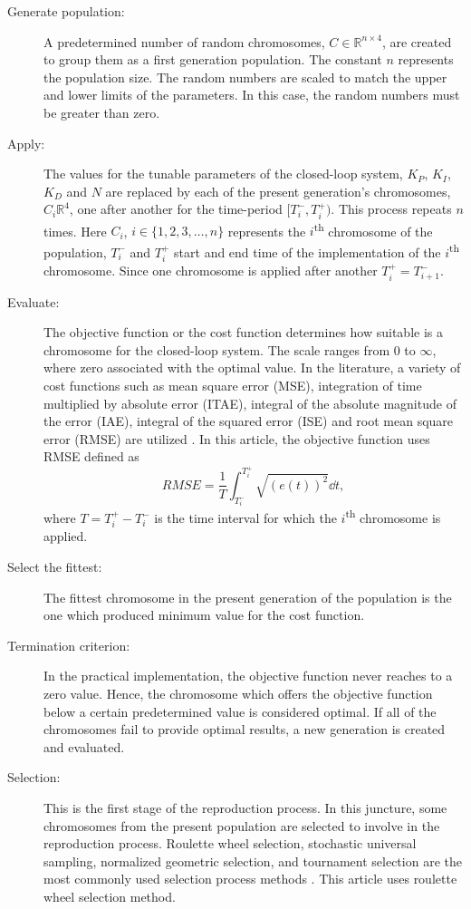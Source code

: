 \documentclass[conference, a4paper, final]{IEEEtran} %
\begin{document}
\begin{description}
    \item[Generate population:] A predetermined number of random chromosomes, $C\in \mathbb{R}^{n\times 4}$, are created to group them as a first generation population. The constant $n$ represents the population size. The random numbers are scaled to match the upper and lower limits of the parameters. In this case, the random numbers must be greater than zero.
    \item[Apply:] The values for the tunable parameters of the closed-loop system, $K_P$, $K_I$, $K_D$ and $N$ are replaced by each of the present generation's chromosomes, $C_i\mathbb{R}^{4}$, one after another for the time-period $[T_i^-, T_i^+)$. This process repeats $n$ times. Here $C_i$, $i \in \{1, 2, 3, \dots, n\}$ represents the $i$\textsuperscript{th} chromosome of the population, $T_i^-$ and $T_i^+$ start and end time of the implementation of the $i$\textsuperscript{th} chromosome. Since one chromosome is applied after another $T_i^+ = T_{i+1}^-$.
    \item[Evaluate:] The objective function or the cost function determines how suitable is a chromosome for the closed-loop system. The scale ranges from 0 to $\infty$, where zero associated with the optimal value. In the literature, a variety of cost functions such as mean square error (MSE), integration of time multiplied by absolute error (ITAE), integral of the absolute magnitude of the error (IAE),  integral of the squared error (ISE) and root mean square error (RMSE) are utilized \cite{1300705, kim2008auto}. In this article, the objective function uses RMSE defined as $$RMSE = \frac{1}{T}\int_{T_i^-}^{T_i^+} \sqrt{(e(t))^2} \dd t,$$ where $T = T_i^+-T_i^-$ is the time interval for which the $i$\textsuperscript{th} chromosome is applied.
    \item[Select the fittest:] The fittest chromosome in the present generation of the population is the one which produced minimum value for the cost function.
    \item[Termination criterion:] In the practical implementation, the objective function never reaches to a zero value. Hence, the chromosome which offers the objective function below a certain predetermined value is considered optimal. If all of the chromosomes fail to provide optimal results, a new generation is created and evaluated.
    \item[Selection:] This is the first stage of the reproduction process. In this juncture, some chromosomes from the present population are selected to involve in the reproduction process. Roulette wheel selection, stochastic universal sampling,  normalized geometric selection, and tournament selection are the most commonly used selection process methods \cite{gen2000genetic, kim2008auto}. This article uses roulette wheel selection method.

\end{description}
\end{document}
